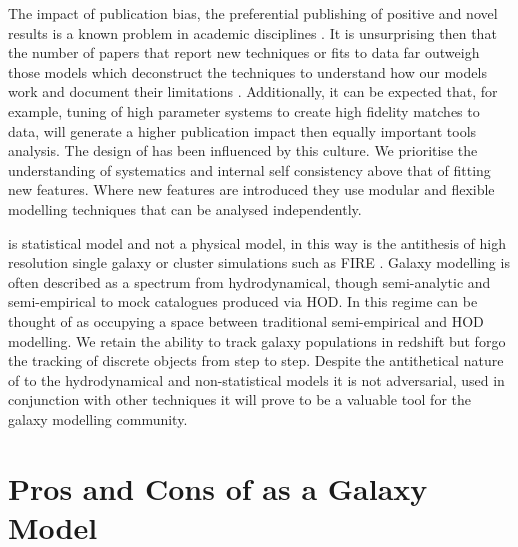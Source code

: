 The impact of publication bias, the preferential publishing of positive and novel results is a known problem in academic disciplines \cite[e.g.]{Song2010DisseminationBiases}. It is unsurprising then that the number of papers that report new techniques or fits to data far outweigh those models which deconstruct the techniques to understand how our models work and document their limitations \cite[e.g.][]{vandenBosch2017DissectingSimulation, vandenBosch2018DisruptionFiction, Asquith2018CosmicModels}. Additionally, it can be expected that, for example, tuning of high parameter systems to create high fidelity matches to data, will generate a higher publication impact then equally important tools analysis. The design of \steel has been influenced by this culture. We prioritise the understanding of systematics and internal self consistency above that of fitting new features. Where new features are introduced they use modular and flexible modelling techniques that can be analysed independently.


\steel is statistical model and not a physical model, in this way is the antithesis of high resolution single galaxy or cluster simulations such as FIRE \cite{Hopkins2018FIRE-2Formation}. Galaxy modelling is often described as a spectrum from hydrodynamical, though semi-analytic and semi-empirical to mock catalogues produced via HOD. In this regime \steel can be thought of as occupying a space between traditional semi-empirical and HOD modelling. We retain the ability to track galaxy populations in redshift but forgo the tracking of discrete objects from step to step. Despite the antithetical nature of \steel to the hydrodynamical and non-statistical models it is not adversarial, used in conjunction with other techniques it will prove to be a valuable tool for the galaxy modelling community. 

\section{Pros and Cons of \steel as a Galaxy Model}

